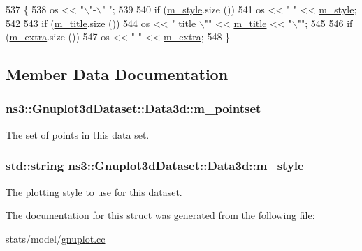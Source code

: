 \begin{DoxyCode}
537 \{
538   os << \textcolor{stringliteral}{"\(\backslash\)"-\(\backslash\)" "};
539 
540   \textcolor{keywordflow}{if} (\hyperlink{structns3_1_1Gnuplot3dDataset_1_1Data3d_a9ea70515c5b324e3ad3704189fb1d87b}{m\_style}.size ())
541     os << \textcolor{stringliteral}{" "} << \hyperlink{structns3_1_1Gnuplot3dDataset_1_1Data3d_a9ea70515c5b324e3ad3704189fb1d87b}{m\_style};
542 
543   \textcolor{keywordflow}{if} (\hyperlink{structns3_1_1GnuplotDataset_1_1Data_ab8c0e78c05f666aaf901794a1e2b06ab}{m\_title}.size ())
544     os << \textcolor{stringliteral}{" title \(\backslash\)""} << \hyperlink{structns3_1_1GnuplotDataset_1_1Data_ab8c0e78c05f666aaf901794a1e2b06ab}{m\_title} << \textcolor{stringliteral}{"\(\backslash\)""};
545 
546   \textcolor{keywordflow}{if} (\hyperlink{structns3_1_1GnuplotDataset_1_1Data_a25343752a00d9ed36df0d3996e177277}{m\_extra}.size ())
547     os << \textcolor{stringliteral}{" "} << \hyperlink{structns3_1_1GnuplotDataset_1_1Data_a25343752a00d9ed36df0d3996e177277}{m\_extra};
548 \}
\end{DoxyCode}


\subsection{Member Data Documentation}
\subsubsection[{\texorpdfstring{m\+\_\+pointset}{m_pointset}}]{ ns3\+::\+Gnuplot3d\+Dataset\+::\+Data3d\+::m\+\_\+pointset}\hypertarget{structns3_1_1Gnuplot3dDataset_1_1Data3d_aa7a81969118ffb0e47cac3e2c967a222}{}\label{structns3_1_1Gnuplot3dDataset_1_1Data3d_aa7a81969118ffb0e47cac3e2c967a222}


The set of points in this data set. 

\subsubsection[{\texorpdfstring{m\+\_\+style}{m_style}}]{\setlength{\rightskip}{0pt plus 5cm}std\+::string ns3\+::\+Gnuplot3d\+Dataset\+::\+Data3d\+::m\+\_\+style}\hypertarget{structns3_1_1Gnuplot3dDataset_1_1Data3d_a9ea70515c5b324e3ad3704189fb1d87b}{}\label{structns3_1_1Gnuplot3dDataset_1_1Data3d_a9ea70515c5b324e3ad3704189fb1d87b}


The plotting style to use for this dataset. 



The documentation for this struct was generated from the following file\+:\begin{DoxyCompactItemize}
\item 
stats/model/\hyperlink{gnuplot_8cc}{gnuplot.\+cc}\end{DoxyCompactItemize}
